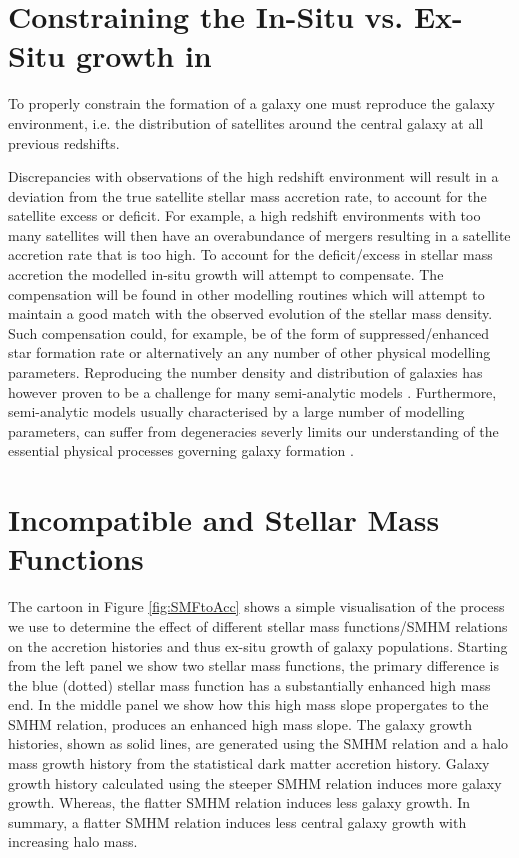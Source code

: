 \section{Constraining the In-Situ vs. Ex-Situ growth in \steel}
To properly constrain the formation of a galaxy one must reproduce the galaxy environment, i.e. the distribution of satellites around the central galaxy at all previous redshifts. 

Discrepancies with observations of the high redshift environment will result in a deviation from the true satellite stellar mass accretion rate, to account for the satellite excess or deficit. For example, a high redshift environments with too many satellites will then have an overabundance of mergers resulting in a satellite accretion rate that is too high. To account for the deficit/excess in stellar mass accretion the modelled in-situ growth will attempt to compensate. The compensation will be found in other modelling routines which will attempt to maintain a good match with the observed evolution of the stellar mass density. Such compensation could, for example, be of the form of suppressed/enhanced star formation rate or alternatively an any number of other physical modelling parameters. Reproducing the number density and distribution of galaxies has however proven to be a challenge for many semi-analytic models \citep[e.g.][]{Asquith2018CosmicModels}. Furthermore, semi-analytic models usually characterised by a large  number of modelling parameters, can suffer from degeneracies severly limits our understanding of the essential physical processes governing galaxy formation \citep[e.g.][]{Lapi2011Herschel-atlasGalaxies, Gonzalez2011Evolution4}.


\section{Incompatible \LCDM and Stellar Mass Functions}
The cartoon in Figure \ref{fig:SMFtoAcc} shows a simple visualisation of the process we use to determine the effect of different stellar mass functions/SMHM relations on the accretion histories and thus ex-situ growth of galaxy populations. 
Starting from the left panel we show two stellar mass functions, the primary difference is the blue (dotted) stellar mass function has a substantially enhanced high mass end. 
In the middle panel we show how this high mass slope propergates to the SMHM relation, produces an enhanced high mass slope. 
The galaxy growth histories, shown as solid lines, are generated using the SMHM relation and a halo mass growth history from the statistical dark matter accretion history.
Galaxy growth history calculated using the steeper SMHM relation induces more galaxy growth. Whereas, the flatter SMHM relation induces less galaxy growth. In summary, a flatter SMHM relation induces less central galaxy growth with increasing halo mass.


